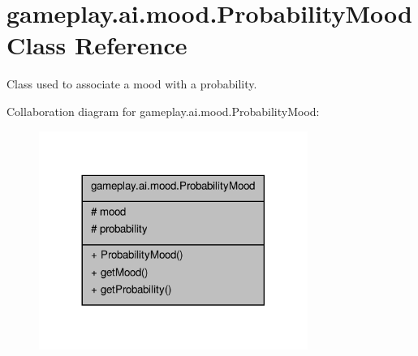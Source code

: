 \hypertarget{classgameplay_1_1ai_1_1mood_1_1_probability_mood}{\section{gameplay.\-ai.\-mood.\-Probability\-Mood Class Reference}
\label{classgameplay_1_1ai_1_1mood_1_1_probability_mood}
}


Class used to associate a mood with a probability.  




Collaboration diagram for gameplay.\-ai.\-mood.\-Probability\-Mood\-:
\nopagebreak
\begin{figure}[H]
\begin{center}
\leavevmode
\includegraphics[width=248pt]{classgameplay_1_1ai_1_1mood_1_1_probability_mood__coll__graph}
\end{center}
\end{figure}
